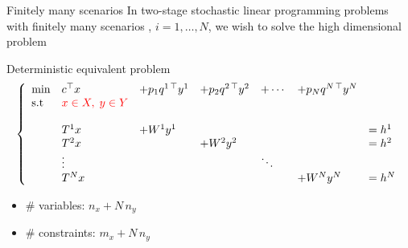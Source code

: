 \begin{frame}{Finitely many scenarios}
In two-stage stochastic linear programming problems with finitely many scenarios
, $i=1,\ldots,N$, we wish to solve the high dimensional problem
\begin{block}{Deterministic equivalent problem}
\[
\left\{
\begin{array}{lllllllllllll}
\min & c^\top x &+ p_1q^{1\,\top} y^1  &+ p_2q^{2\,\top} y^2 &+ \cdots  &+ p_Nq^{N\,\top} y^N \\
\mbox{s.t}& {\color{red}x \in X, \;y \in Y}  \\
&\\
& T^1x           &+ W^1y^1&&&&= h^1 \\
& T^2x           &&+ W^2y^2&&&= h^2 \\
& \vdots         &&&\ddots \\
& T^Nx           &&&&+ W^Ny^N&= h^N
\end{array}
\right.
\]

\pula

\end{block}

\begin{itemize}
\item \# variables: $n_x + N\, n_y$
\item \# constraints: $m_x + N\, n_y$
\end{itemize}



\end{frame}
%
%
%
%
%



